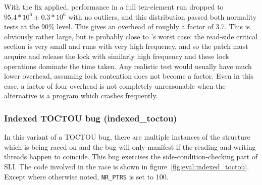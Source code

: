 With the fix applied, performance in a full ten-element run dropped to
$95.4 * 10^6 \pm 0.3 * 10^6$ with no outliers, and this distribution
passed both normality tests at the 90\% level.  This gives an overhead
of roughly a factor of 3.7.  This is obviously rather large, but is
probably close to {\technique}'s worst case: the read-side critical
section is very small and runs with very high frequency, and so the
patch must acquire and release the lock with similarly high frequency
and these lock operations dominate the time taken.  Any realistic test
would usually have much lower overhead, assuming lock contention does
not become a factor.  Even in this case, a factor of four overhead is
not completely unreasonable when the alternative is a program which
crashes frequently.







\subsubsection{Indexed TOCTOU bug (indexed\_toctou)}
\label{sect:eval:indexed_toctou}

In this variant of a TOCTOU bug, there are multiple instances of the
structure which is being raced on and the bug will only manifest if
the reading and writing threads happen to coincide.  This bug
exercises the side-condition-checking part of SLI.  The code involved
in the race is shown in figure~\ref{fig:eval:indexed_toctou}.  Except
where otherwise noted, \verb|NR_PTRS| is set to 100.


